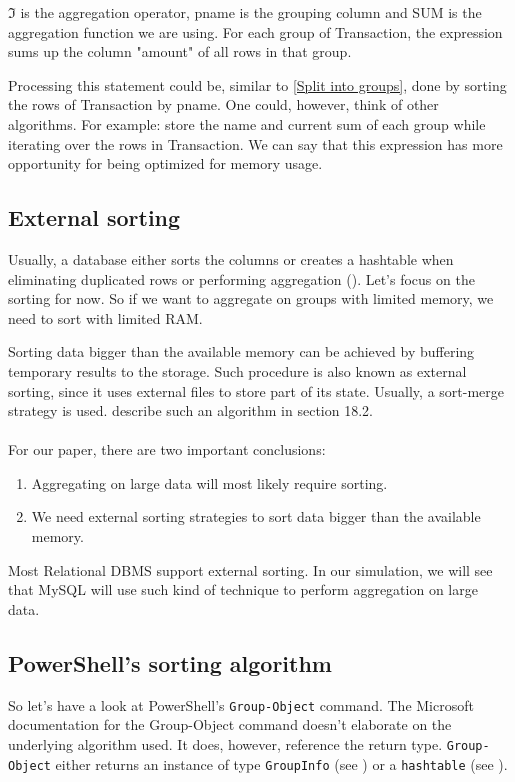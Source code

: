 $\mathfrak{I}$ is the aggregation operator, pname is the grouping column 
and SUM is the aggregation function we are using. For each group of
Transaction, the expression sums up the column "amount"
of all rows in that group.

Processing this statement could be, similar to \ref{Split into groups},
done by sorting the rows of Transaction by pname. One could, however,
think of other algorithms. For example:
store the name and current sum of each group while iterating over
the rows in Transaction. We can say that this expression
has more opportunity for being optimized for memory usage.

\subsection{External sorting} \label{External Sorting}

Usually, a database either sorts the columns or creates a hashtable
when eliminating duplicated rows or performing aggregation (\cite{Edga}).
Let's focus on the sorting for now. So if we want to aggregate on groups
with limited memory, we need to sort with limited RAM.

Sorting data bigger than the available memory can be achieved by buffering
temporary results to the storage. Such procedure is also known as external
sorting, since it uses external files to store part of its state. Usually,
a sort-merge strategy is used. \cite{Elma89} describe such an algorithm
in section 18.2. \\ \\
For our paper, there are two important conclusions:
\begin{enumerate}
    \item Aggregating on large data will most likely require sorting.
    \item We need external sorting strategies to sort data bigger than
the available memory.
\end{enumerate}
Most Relational \gls{DBMS} support external sorting. In our simulation,
we will see that MySQL will use such kind of technique to perform
aggregation on large data.

\subsection{PowerShell's sorting algorithm}

So let's have a look at PowerShell's \verb+Group-Object+ command.
The Microsoft documentation \cite{docPSGO} for the Group-Object
command doesn't elaborate on the underlying algorithm used.
It does, however, reference the return type.
\verb+Group-Object+ either returns an instance of type
\verb+GroupInfo+ (see \cite{docPSGI})
or a \verb+hashtable+ (see \cite{docPSHT}).

